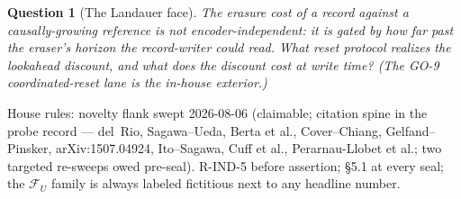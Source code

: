 \documentclass[11pt]{article}
\newtheorem{question}{Question}
\begin{document}
\begin{question}[The Landauer face]
The erasure cost of a record against a causally-growing reference
is \emph{not encoder-independent}: it is gated by how far past the
eraser's horizon the record-writer could read. What reset protocol
realizes the lookahead discount, and what does the discount cost at
write time? (The GO-9 coordinated-reset lane is the in-house
exterior.)
\end{question}

House rules: novelty flank swept 2026-08-06 (claimable; citation
spine in the probe record --- del~Rio, Sagawa--Ueda, Berta et al.,
Cover--Chiang, Gelfand--Pinsker, arXiv:1507.04924, Ito--Sagawa,
Cuff et al., Perarnau-Llobet et al.; two targeted re-sweeps owed
pre-seal). R-IND-5 before assertion; \S5.1 at every seal; the
$\mathcal F_U$ family is always labeled fictitious next to any
headline number.
\end{document}
